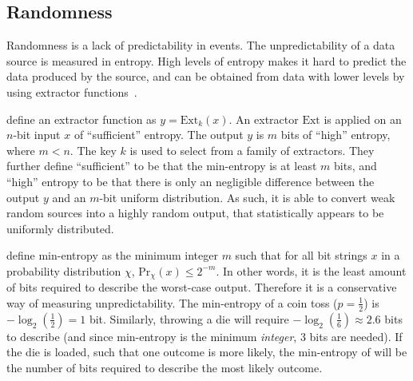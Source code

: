 \subsection{Randomness}\label{sub:prelims_randomness}

 Randomness is a lack of predictability in events.
The unpredictability of a data source is measured in entropy.
High levels of entropy makes it hard to predict the data produced by the source, and can be obtained from data with lower levels  by using extractor functions~\cite{pseudorandomness}.

\citet{bonneau2015bitcoin} define an extractor function as $y = \text{Ext}_k(x)$. 
An extractor $\text{Ext}$ is applied on an $n$-bit input $x$ of \enquote{sufficient} entropy.
The output $y$ is $m$ bits of \enquote{high} entropy, where $m < n$. The key $k$ is used to select from a family of extractors.
They further define \enquote{sufficient} to be that the min-entropy is at least $m$ bits, and \enquote{high} entropy to be that there is only an negligible difference between the output $y$ and an $m$-bit uniform distribution.
As such, it is able to convert weak random sources into a highly random output, that statistically appears to be uniformly distributed.


\citet{dodis2004randomness} define min-entropy as the minimum integer $m$ such that for all bit strings $x$ in a probability distribution $\chi$, $\text{Pr}_\chi(x) \leq 2^{-m}$.
In other words, it is the least amount of bits required to describe the worst-case output.
Therefore it is a conservative way of measuring unpredictability.
The min-entropy of a coin toss ($p = \frac{1}{2}$) is $-\log_2(\frac{1}{2}) = 1$ bit. Similarly, throwing a die will require $-\log_2(\frac{1}{6}) \approx 2.6$ bits to describe (and since min-entropy is the minimum \emph{integer}, 3 bits are needed).
If the die is loaded, such that one outcome is more likely, the min-entropy of will be the number of bits required to describe the most likely outcome.

